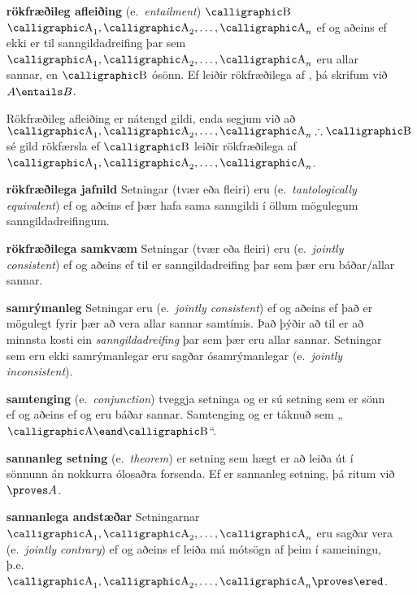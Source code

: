 \begin{enumerate}[leftmargin=35pt]
	
	\item[\textbf{rökfræðileg afleiðing}] (e.\ \emph{entailment}) $\meta{B}$  $\meta{A}_1, \meta{A}_2, \ldots, \meta{A}_n$ ef og aðeins ef ekki er til sanngildadreifing þar sem $\meta{A}_1, \meta{A}_2, \ldots, \meta{A}_n$ eru allar sannar, en $\meta{B}$ ósönn. Ef  leiðir rökfræðilega af , þá skrifum við $A \entails B$.
	
	Rökfræðileg afleiðing er nátengd gildi, enda segjum við að $\meta{A}_1, \meta{A}_2, \ldots, \meta{A}_n \therefore \meta{B}$ sé gild rökfærsla ef $\meta{B}$ leiðir rökfræðilega af $\meta{A}_1, \meta{A}_2, \ldots, \meta{A}_n$. 

	\item[\textbf{rökfræðilega jafnild}] Setningar (tvær eða fleiri) eru  (e.\ \emph{tautologically equivalent}) ef og aðeins ef þær hafa sama sanngildi í öllum mögulegum sanngildadreifingum.
	
	\item[\textbf{rökfræðilega samkvæm}]Setningar (tvær eða fleiri) eru  (e.\ \emph{jointly consistent}) ef og aðeins ef til er sanngildadreifing þar sem þær eru báðar/allar sannar.
	
	\item[\textbf{samrýmanleg}] Setningar eru  (e.\ \emph{jointly consistent}) ef og aðeins ef það er mögulegt fyrir þær að vera allar sannar samtímis. Það þýðir að til er að minnsta kosti ein \emph{sanngildadreifing} þar sem þær eru allar sannar. Setningar sem eru ekki samrýmanlegar eru sagðar ósamrýmanlegar (e.\ \emph{jointly inconsistent}).
	
	\item[\textbf{samtenging}] (e.\ \emph{conjunction}) tveggja setninga  og  er sú setning sem er sönn ef og aðeins ef  og  eru báðar sannar. Samtenging  og  er táknuð sem „$\meta{A} \eand \meta{B}$“.
		
	\item[\textbf{sannanleg setning}] (e.\ \emph{theorem}) er setning sem hægt er að leiða út í sönnunn án nokkurra ólosaðra forsenda. Ef  er sannanleg setning, þá ritum við $\proves A$.
		
	\item[\textbf{sannanlega andstæðar}] Setningarnar $\meta{A}_1, \meta{A}_2, \ldots, \meta{A}_n$ eru sagðar vera  (e.\ \emph{jointly contrary}) ef og aðeins ef leiða má mótsögn af þeim í sameiningu, þ.e.\ $\meta{A}_1, \meta{A}_2, \ldots, \meta{A}_n \proves \ered$.
			

\end{enumerate}
